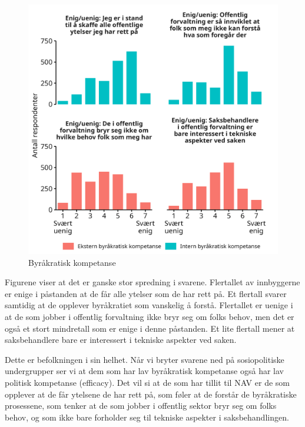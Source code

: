\documentclass[
  12pt,
  a4paper, 12pt]{article}
\begin{document}
\begin{figure}

{\centering \includegraphics[width=0.8\linewidth]{figs/png/fig_be_hist} 

}

\caption{Byråkratisk kompetanse}\label{fig:unnamed-chunk-9}
\end{figure}

Figurene viser at det er ganske stor spredning i svarene.
Flertallet av innbyggerne er enige i påstanden at de får alle ytelser som de har rett på.
Et flertall svarer samtidig at de opplever byråkratiet som vanskelig å forstå.
Flertallet er uenige i at de som jobber i offentlig forvaltning ikke bryr seg om folks behov, men det er også et stort mindretall som er enige i denne påstanden.
Et lite flertall mener at saksbehandlere bare er interessert i tekniske aspekter ved saken.

Dette er befolkningen i sin helhet.
Når vi bryter svarene ned på sosiopolitiske undergrupper ser vi at dem som har lav byråkratisk kompetanse også har lav politisk kompetanse (efficacy).
Det vil si at de som har tillit til NAV er de som opplever at de får ytelsene de har rett på, som føler at de forstår de byråkratiske prosessene, som tenker at de som jobber i offentlig sektor bryr seg om folks behov, og som ikke bare forholder seg til tekniske aspekter i saksbehandlingen.
\end{document}
